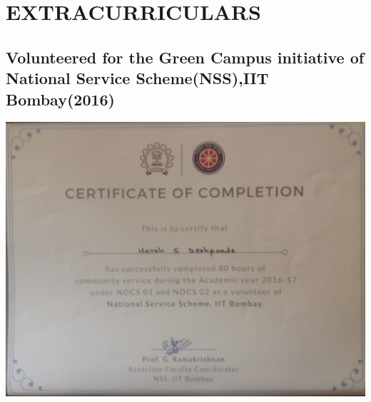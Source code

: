 \documentclass{article}
\begin{document}
\section{EXTRACURRICULARS}
	\subsection{Volunteered for the Green Campus initiative of National Service Scheme(NSS),IIT Bombay(2016)}
\begin{center}
	\includegraphics[width = 1.1\textwidth]{EX/nss.jpeg}{\centering}
\end{center}
\end{document}
